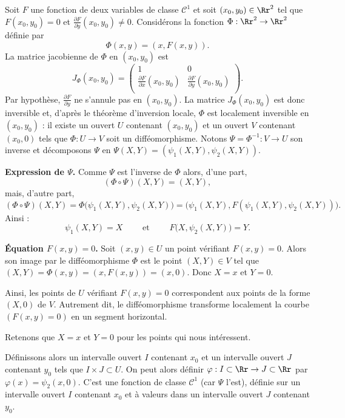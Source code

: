 \documentclass[11pt, class=report,crop=false]{standalone}
\begin{document}
Soit $F$ une fonction  de deux variables de classe $\mathcal{C}^1$ et soit $(x_0,y_0) \in \Rr^2$ tel que $F(x_0,y_0)=0$ et $\frac{\partial F}{\partial y}(x_0,y_0)\neq 0$. Considérons la fonction $\Phi : \Rr^2 \to \Rr^2$ définie par
$$
\Phi(x,y)=(x,F(x,y)).
$$
La matrice jacobienne de $\Phi$ en $(x_0,y_0)$ est
$$
J_\Phi(x_0,y_0) = 
\begin{pmatrix}  1 & 0 \\
\frac{\partial F}{\partial x}(x_0,y_0) & \frac{\partial F}{\partial y}(x_0,y_0) \\ \end{pmatrix}.
$$
Par hypothèse, $\frac{\partial F}{\partial y}$ ne s'annule pas en $(x_0,y_0)$. La matrice $J_\Phi(x_0,y_0)$ est donc inversible et, d'après le théorème d'inversion locale, $\Phi$ est localement inversible en $(x_0,y_0)$ : il existe un ouvert $U$ contenant $(x_0,y_0)$ et un ouvert $V$ contenant $(x_0,0)$ tels que $\Phi : U \to V$ soit un difféomorphisme. Notons $\Psi=\Phi^{-1} : V \to U$ son inverse et décomposons $\Psi$ en $\Psi(X,Y) = (\psi_1(X,Y),\psi_2(X,Y))$.

\bigskip

\textbf{Expression de $\Psi$.}
Comme $\Psi$ est l'inverse de $\Phi$ alors, d'une part, 
$$(\Phi \circ \Psi) (X,Y) = (X,Y),$$
mais, d'autre part,
$$(\Phi \circ \Psi) (X,Y)
= \Phi\big( \psi_1(X,Y), \psi_2(X,Y) \big) 
= \big(\psi_1(X,Y), F ( \psi_1(X,Y), \psi_2(X,Y)) \big).$$
Ainsi :
$$\psi_1(X,Y) = X \qquad \text{ et } \qquad F \big( X, \psi_2(X,Y) \big) = Y.$$

\bigskip

\textbf{\'Equation $F(x,y)=0$.}
Soit $(x,y) \in U$ un point vérifiant $F(x,y)=0$.
Alors son image par le difféomorphisme $\Phi$ est 
le point $(X,Y) \in V$ tel que $(X,Y)=\Phi(x,y)=(x,F(x,y))=(x,0)$. Donc $X=x$ et $Y=0$.

Ainsi, les points de $U$ vérifiant $F(x,y)=0$ correspondent aux points de la forme $(X,0)$ de $V$. Autrement dit, le difféomorphisme transforme localement la courbe $(F(x,y)=0)$ en un segment horizontal.


Retenons que $X=x$ et $Y=0$ pour les points qui nous intéressent. 

Définissons alors un intervalle ouvert $I$ contenant $x_0$ et un intervalle ouvert $J$ contenant $y_0$ tels que $I \times J \subset U$.
On peut alors définir $\varphi : I \subset \Rr \to J \subset \Rr$ par $\varphi(x) = \psi_2(x,0)$. 
C'est une fonction de classe  $\mathcal{C}^1$ (car $\Psi$ l'est), définie sur un intervalle ouvert $I$ contenant $x_0$ et à valeurs dans un intervalle ouvert $J$ contenant $y_0$.
\end{document}
